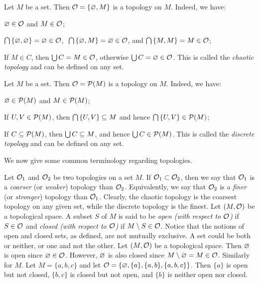 \be
Let $M$ be a set. Then $\mathcal{O}=\{\varnothing , M\}$ is a topology on $M$. Indeed, we have:
\ben
\item[i)] $\varnothing \in \mathcal{O}$ and $M \in \mathcal{O}$;
\item[ii)] $\bigcap\, \{\varnothing,\varnothing\} = \varnothing \in \mathcal{O}$, $\ \bigcap\, \{\varnothing,M\} = \varnothing \in \mathcal{O}$, and $\bigcap\, \{M,M\} = M \in \mathcal{O}$;
\item[iii)] If $M \in C$, then $\bigcup C = M \in \mathcal{O}$, otherwise $\bigcup C = \varnothing \in \mathcal{O}$.
\een
This is called the \emph{chaotic topology} and can be defined on any set.
\ee

\be
Let $M$ be a set. Then $\mathcal{O}=\mathcal{P}(M)$ is a topology on $M$. Indeed, we have:
\ben
\item[i)] $\varnothing \in \mathcal{P}(M)$ and $M \in \mathcal{P}(M)$;
\item[ii)] If $U,V \in \mathcal{P}(M)$, then $\bigcap\, \{U,V\} \subseteq M$ and hence $\bigcap\, \{U,V\} \in \mathcal{P}(M)$;
\item[iii)] If $C\subseteq\mathcal{P}(M)$, then $\bigcup C \subseteq M$, and hence $\bigcup C \in \mathcal{P}(M)$.
\een
This is called the \emph{discrete topology} and can be defined on any set.
\ee




We now give some common terminology regarding topologies.

\bd
Let $\mathcal{O}_1$ and $\mathcal{O}_2$ be two topologies on a set $M$. If $\mathcal{O}_1 \subset \mathcal{O}_2$, then we say that $\mathcal{O}_1$ is a \emph{coarser} (or \emph{weaker}) topology than $\mathcal{O}_2$. Equivalently, we say that $\mathcal{O}_2$ is a \emph{finer} (or \emph{stronger}) topology than $\mathcal{O}_1$.
\ed
Clearly, the chaotic topology is the coarsest topology on any given set, while the discrete topology is the finest.
\bd
Let $(M,\mathcal{O})$ be a topological space. A subset $S$ of $M$ is said to be \emph{open (with respect to $\mathcal{O}$)} if $S \in \mathcal{O}$ and \emph{closed (with respect to $\mathcal{O}$)} if $M\setminus S \in \mathcal{O}$. 
\ed
Notice that the notions of open and closed sets, as defined, are not mutually exclusive. A set could be both or neither, or one and not the other.
\be
Let $(M,\mathcal{O})$ be a topological space. Then $\varnothing$ is open since $\varnothing \in \mathcal{O}$. However, $\varnothing$ is also closed since $M\setminus \varnothing = M \in \mathcal{O}$. Similarly for $M$.
\ee
\be
Let $M = \{a,b,c\}$ and let $\mathcal{O}=\{\varnothing,\{a\},\{a,b\},\{a,b,c\}\}$. Then $\{a\}$ is open but not closed, $\{b,c\}$ is closed but not open, and $\{b\}$ is neither open nor closed.
\ee





